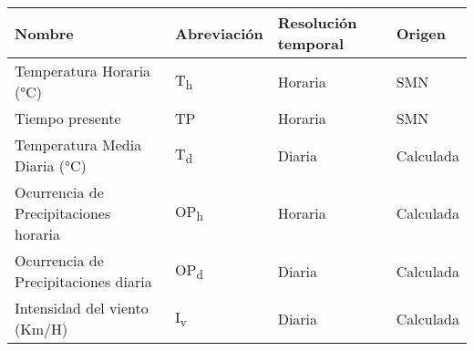 \begin{table}[ht]
\centering
\begin{tabular}{llll}
  \hline
Nombre & Abreviación & Resolución temporal & Origen \\ 
  \hline
Temperatura Horaria (°C) & T\textsubscript{h} & Horaria & SMN \\ 
  Tiempo presente & TP & Horaria & SMN \\ 
  Temperatura Media Diaria (°C) & T\textsubscript{d} & Diaria & Calculada \\ 
  Ocurrencia de Precipitaciones horaria & OP\textsubscript{h} & Horaria & Calculada \\ 
  Ocurrencia de Precipitaciones diaria & OP\textsubscript{d} & Diaria & Calculada \\ 
  Intensidad del viento (Km/H) & I\textsubscript{v} & Diaria & Calculada \\ 
   \hline
\end{tabular}
\end{table}

